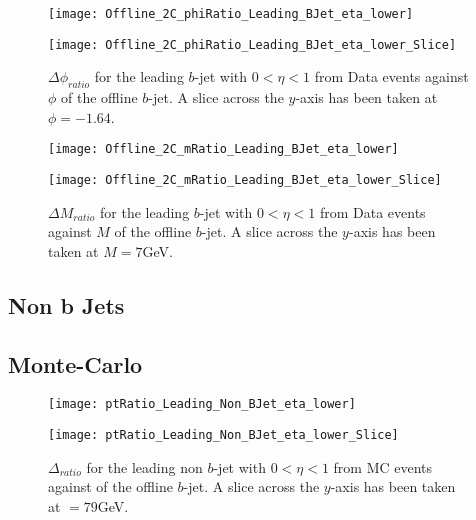 				\begin{figure}[h]
					\centering
					
					\begin{minipage}[h]{0.33\linewidth}
						\texttt{[image: Offline\_2C\_phiRatio\_Leading\_BJet\_eta\_lower]}
					\end{minipage}
					\quad
					\begin{minipage}[h]{0.33\linewidth}
						\texttt{[image: Offline\_2C\_phiRatio\_Leading\_BJet\_eta\_lower\_Slice]}
					\end{minipage}
					\caption{$\Delta \phi_{ratio}$ for the leading \pt $b$-jet with $0 < \eta < 1$ from Data events against $\phi$ of the offline $b$-jet. A slice across the $y$-axis has been taken at $\phi=-1.64$. }
					\label{fig:D:leadingbphicentral}
				\end{figure}
				
				\begin{figure}[h]
					\centering
					
					\begin{minipage}[h]{0.33\linewidth}
						\texttt{[image: Offline\_2C\_mRatio\_Leading\_BJet\_eta\_lower]}
					\end{minipage}
					\quad
					\begin{minipage}[h]{0.33\linewidth}
						\texttt{[image: Offline\_2C\_mRatio\_Leading\_BJet\_eta\_lower\_Slice]}
					\end{minipage}
					\caption{$\Delta M_{ratio}$ for the leading \pt $b$-jet with $0 < \eta < 1$ from Data events against $M$ of the offline $b$-jet. A slice across the $y$-axis has been taken at $M=7$GeV. }
					\label{fig:D:leadingbmcentral}
				\end{figure}

\newpage
\subsection{Non b Jets}
		\subsection{Monte-Carlo}

		\begin{figure}[h]
			\centering
			\begin{minipage}[h]{0.33\linewidth}
				\texttt{[image: ptRatio\_Leading\_Non\_BJet\_eta\_lower]}

			\end{minipage}
			\quad
			\begin{minipage}[h]{0.33\linewidth}
				\texttt{[image: ptRatio\_Leading\_Non\_BJet\_eta\_lower\_Slice]}
			\end{minipage}
			\caption{$\Delta $\pt$_{ratio}$ for the leading \pt non $b$-jet with $0 < \eta < 1$ from MC events against \pt of the offline $b$-jet. A slice across the $y$-axis has been taken at \pt$=79$GeV. }
			\label{fig:MC:leadingnonbptcentral}
		\end{figure}

